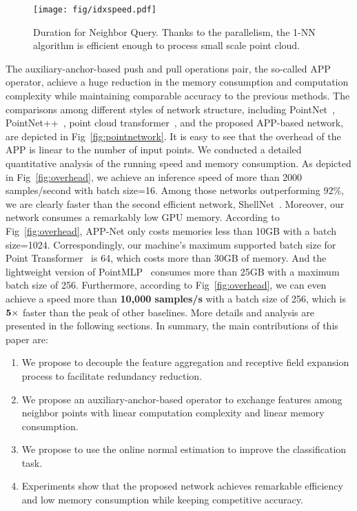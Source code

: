 \documentclass[journal]{IEEEtran}
\begin{document}
\begin{figure}[t]
\begin{center}
\label{fig:voxeltime}
\texttt{[image: fig/idxspeed.pdf]}
\end{center}
\vspace{-0.3cm}
   \caption{Duration for Neighbor Query. Thanks to the parallelism, the 1-NN algorithm is efficient enough to process small scale point cloud.}
\end{figure}
 
 The auxiliary-anchor-based push and pull operations pair, the so-called APP operator, achieve a huge reduction in the memory consumption and computation complexity while maintaining comparable accuracy to the previous methods. The comparisons among different styles of network structure, including PointNet~\cite{PointNet}, PointNet++~\cite{PointNet++}, point cloud transformer~\cite{guo2021pct}, and the proposed APP-based network, are depicted in Fig~\ref{fig:pointnetwork}. It is easy to see that the overhead of the APP is linear to the number of input points. We conducted a detailed quantitative analysis of the running speed and memory consumption. As depicted in Fig~\ref{fig:overhead}, we achieve an inference speed of more than 2000 samples/second with batch size=16. Among those networks outperforming 92\%, we are clearly faster than the second efficient network, ShellNet~\cite{shellnet}. Moreover, our network consumes a remarkably low GPU memory. According to Fig~\ref{fig:overhead}, APP-Net only costs memories less than 10GB with a batch size=1024. Correspondingly, our machine's maximum supported batch size for Point Transformer~\cite{zhao2021point} is 64, which costs more than 30GB of memory. And the lightweight version of PointMLP~\cite{ma2022rethinking} consumes more than 25GB with a maximum batch size of 256. Furthermore, according to Fig~\ref{fig:overhead}, we can even achieve a speed more than {\bf10,000 samples/s} with a batch size of 256, which is {$\bf5\times$} faster than the peak of other baselines. More details and analysis are presented in the following sections. In summary, the main contributions of this paper are:
 
 \begin{enumerate}
     \item We propose to decouple the feature aggregation and receptive field expansion process to facilitate redundancy reduction.
     \item We propose an auxiliary-anchor-based operator to exchange features among neighbor points with linear computation complexity and linear memory consumption.
\item We propose to use the online normal estimation to improve the classification task.
     \item Experiments show that the proposed network achieves remarkable efficiency and low memory consumption while keeping competitive accuracy.
 \end{enumerate}
\end{document}
